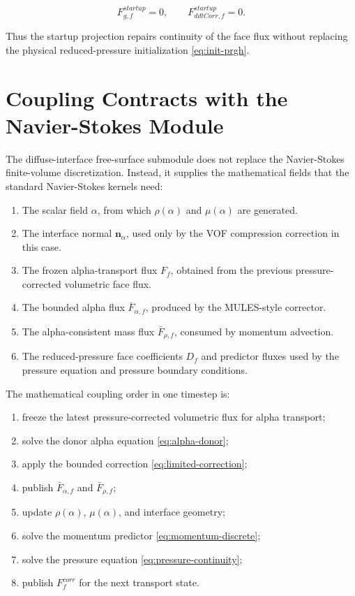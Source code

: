 \documentclass[11pt]{article}
\begin{document}
\begin{equation}
  F_{g,f}^{startup}=0,
  \qquad
  F_{ddtCorr,f}^{startup}=0.
\end{equation}

Thus the startup projection repairs continuity of the face flux without
replacing the physical reduced-pressure initialization \eqref{eq:init-prgh}.

\section{Coupling Contracts with the Navier-Stokes Module}

The diffuse-interface free-surface submodule does not replace the Navier-Stokes
finite-volume discretization.  Instead, it supplies the mathematical fields
that the standard Navier-Stokes kernels need:

\begin{enumerate}[leftmargin=2.5em]
  \item The scalar field \(\alpha\), from which \(\rho(\alpha)\) and
        \(\mu(\alpha)\) are generated.
  \item The interface normal \(\mathbf{n}_{\alpha}\), used only by the VOF
        compression correction in this case.
  \item The frozen alpha-transport flux \(F_f\), obtained from the previous
        pressure-corrected volumetric face flux.
  \item The bounded alpha flux \(\bar{F}_{\alpha,f}\), produced by the MULES-style
        corrector.
  \item The alpha-consistent mass flux \(\bar{F}_{\rho,f}\), consumed by
        momentum advection.
  \item The reduced-pressure face coefficients \(D_f\) and predictor fluxes
        used by the pressure equation and pressure boundary conditions.
\end{enumerate}

The mathematical coupling order in one timestep is:

\begin{enumerate}[leftmargin=2.5em]
  \item freeze the latest pressure-corrected volumetric flux for alpha
        transport;
  \item solve the donor alpha equation \eqref{eq:alpha-donor};
  \item apply the bounded correction \eqref{eq:limited-correction};
  \item publish \(\bar{F}_{\alpha,f}\) and \(\bar{F}_{\rho,f}\);
  \item update \(\rho(\alpha)\), \(\mu(\alpha)\), and interface geometry;
  \item solve the momentum predictor \eqref{eq:momentum-discrete};
  \item solve the pressure equation \eqref{eq:pressure-continuity};
  \item publish \(F_f^{corr}\) for the next transport state.
\end{enumerate}
\end{document}
